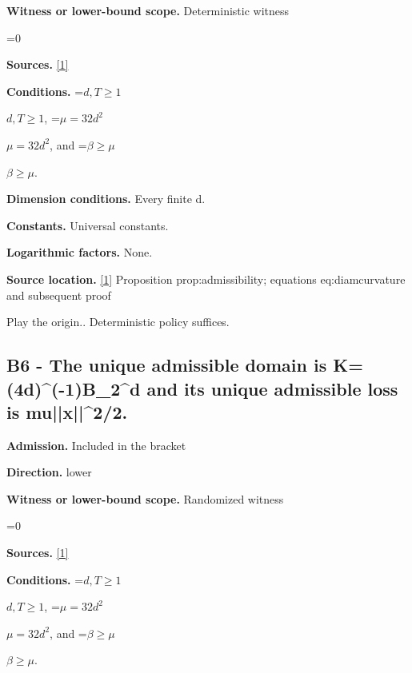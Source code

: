 \documentclass[10pt,a4paper]{article}
\newcommand{\AtlasMath}[1]{\par\begingroup\centering\setbox0=\hbox{$\displaystyle #1$}\ifdim\wd0>1.4\linewidth\typeout{ATLAS WIDE FORMULA: \the\wd0}\fi\ifdim\wd0>\linewidth\resizebox{\linewidth}{!}{\box0}\else\box0\fi\par\endgroup}
\newcommand{\AtlasInlineMath}[1]{\begingroup\setbox0=\hbox{$#1$}\ifdim\wd0>.4\linewidth\endgroup\AtlasMath{#1}\else\endgroup$#1$\fi}
\begin{document}
\textbf{Witness or lower-bound scope.} Deterministic witness



\AtlasMath{0}


\textbf{Sources.} \href{https://github.com/WU-Wendao/Colombo/blob/main/colombo_sensorium/Complexity_altas/data/sources/colombo/U01/manuscript.pdf}{[1]}



\textbf{Conditions.} \AtlasInlineMath{d,T\ge1}, \AtlasInlineMath{\mu=32d^2}, and \AtlasInlineMath{\beta\ge\mu}.



\textbf{Dimension conditions.} Every finite d.



\textbf{Constants.} Universal constants.



\textbf{Logarithmic factors.} None.



\textbf{Source location.} \href{https://github.com/WU-Wendao/Colombo/blob/main/colombo_sensorium/Complexity_altas/data/sources/colombo/U01/manuscript.pdf}{[1]} Proposition prop:admissibility; equations eq:diamcurvature and subsequent proof



Play the origin.. Deterministic policy suffices.



\subsection{B6 - The unique admissible domain is K=(4d)\textasciicircum{}(-1)B\_2\textasciicircum{}d and its unique admissible loss is mu||x||\textasciicircum{}2/2.}


\textbf{Admission.} Included in the bracket



\textbf{Direction.} lower



\textbf{Witness or lower-bound scope.} Randomized witness



\AtlasMath{0}


\textbf{Sources.} \href{https://github.com/WU-Wendao/Colombo/blob/main/colombo_sensorium/Complexity_altas/data/sources/colombo/U01/manuscript.pdf}{[1]}



\textbf{Conditions.} \AtlasInlineMath{d,T\ge1}, \AtlasInlineMath{\mu=32d^2}, and \AtlasInlineMath{\beta\ge\mu}.
\end{document}
